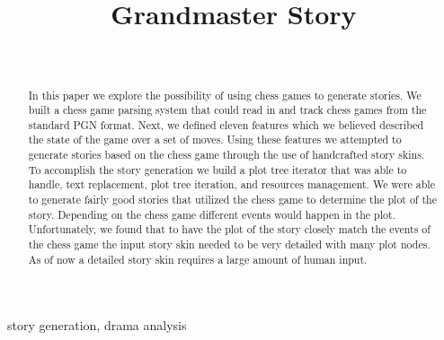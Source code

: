 \documentclass[journal]{./IEEEtran}
\begin{document}
\title{Grandmaster Story}

\newcommand{\sysname}{Grand Master Story}

\author{\\
}

\maketitle

\begin{abstract}

In this paper we explore the possibility of using chess games to generate stories. We built a chess game parsing system that could read in and track chess games from the standard PGN format. Next, we defined eleven features which we believed described the state of the game over a set of moves. Using these features we attempted to generate stories based on the chess game through the use of handcrafted story skins. To accomplish the story generation we build a plot tree iterator that was able to handle, text replacement, plot tree iteration, and resources management. We were able to generate fairly good stories that utilized the chess game to determine the plot of the story. Depending on the chess game different events would happen in the plot. Unfortunately, we found that to have the plot of the story closely match the events of the chess game the input story skin needed to be very detailed with many plot nodes. As of now a detailed story skin requires a large amount of human input.

\end{abstract}

\begin{IEEEkeywords}
story generation, drama analysis
\end{IEEEkeywords}
\end{document}
